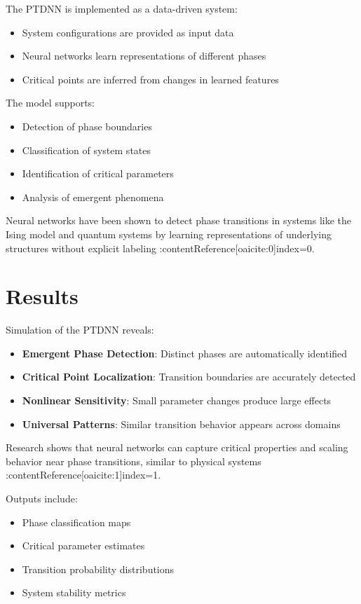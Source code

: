 \documentclass[12pt]{article}
\begin{document}
The PTDNN is implemented as a data-driven system:

\begin{itemize}
\item System configurations are provided as input data
\item Neural networks learn representations of different phases
\item Critical points are inferred from changes in learned features
\end{itemize}

The model supports:

\begin{itemize}
\item Detection of phase boundaries
\item Classification of system states
\item Identification of critical parameters
\item Analysis of emergent phenomena
\end{itemize}

Neural networks have been shown to detect phase transitions in systems like the Ising model and quantum systems by learning representations of underlying structures without explicit labeling :contentReference[oaicite:0]{index=0}.

\section{Results}

Simulation of the PTDNN reveals:

\begin{itemize}
\item \textbf{Emergent Phase Detection}: Distinct phases are automatically identified
\item \textbf{Critical Point Localization}: Transition boundaries are accurately detected
\item \textbf{Nonlinear Sensitivity}: Small parameter changes produce large effects
\item \textbf{Universal Patterns}: Similar transition behavior appears across domains
\end{itemize}

Research shows that neural networks can capture critical properties and scaling behavior near phase transitions, similar to physical systems :contentReference[oaicite:1]{index=1}.

Outputs include:

\begin{itemize}
\item Phase classification maps
\item Critical parameter estimates
\item Transition probability distributions
\item System stability metrics
\end{itemize}
\end{document}
